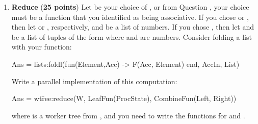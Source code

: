 \documentclass{article}
\begin{document}
\begin{enumerate}
    \begin{enumerate}
      \item {}  (\textbf{5 points})
      \item {}  (\textbf{5 points})
      \item {}  (\textbf{5 points})
      \item {}.  (\textbf{5 points})
      \item From the four functions listed above, identify one that is associative and commutative. (\textbf{2 points})
      \item From the four functions listed above, identify one that is associative and not commutative.
	Given an example for  and  that shows , where
	 is one of the four functions listed above.
    \end{enumerate}

  \item \textbf{Reduce} (\textbf{25 points})
    Let  be your choice of ,  or  from
    Question , your choice must be a function that you identified as being associative.
    If you chose  or , then let  or , respectively, and  be a list of numbers.
    If you chose , then let  and  be a list of tuples
    of the form  where  and  are numbers.
    Consider folding a list with your function:
    \begin{xcode}
      Ans = lists:foldl(fun(Element,Acc) -> F(Acc, Element) end, AccIn, List)
    \end{xcode}
    Write a parallel implementation of this computation:
    \begin{xcode}
      Ans = wt\=ree:reduce(W, LeafFun(ProcState), CombineFun(Left, Right))
    \end{xcode}
    where  is a worker tree from , and you need to
    write the functions for  and .


\end{enumerate}
\end{document}

